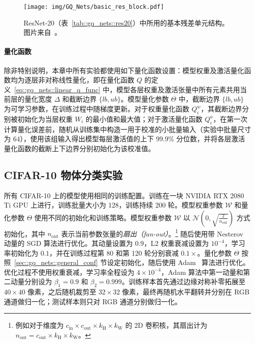 \documentclass[
  fontset = mac,
]{shtthesis}
\providecommand{\NormalDist}[1]{\mathcal{N} \left( #1 \right)}
\begin{document}
\begin{figure}[htb]
  \centering
  \texttt{[image: img/GQ\_Nets/basic\_res\_block.pdf]}
  \caption{ResNet-20（表~\ref{tab::gq_nets::res20}）中所用的基本残差单元结构。图片来自~\citet{He_2016}。}
  \label{img::gq_nets::basic_res_block}
\end{figure}

\paragraph{量化函数}
除非特别说明，本章中所有实验都使用如下量化函数设置：模型权重及激活量化函数均为逐层非对称线性量化，即在量化函数 $Q$ 的定义~\eqref{eq::gq_nets::linear_q_func} 中，模型各层权重及激活张量中所有元素共用当前层的量化宽度 $\Delta$ 和截断边界 $\{lb, ub\}$。模型量化参数 $\Theta$ 中，截断边界 $\{lb, ub\}$ 为可学习参数，在训练过程中随梯度更新。对于权重量化函数 $Q^w_i$，其截断边界分别被初始化为当层权重 $W_i$ 的最小值和最大值；对于激活量化函数 $Q^a_i$，在第一次计算量化误差前，随机从训练集中构造一用于校准的小批量输入（实验中批量尺寸为 $64$），使用该组输入得出模型每层激活值的上下 $99.9\%$ 分位数，并将各层激活量化函数的截断上下边界分别初始化为该校准值。
\subsection{CIFAR-10 物体分类实验} \label{sec::gq_nets::cifar10_experiments}
所有 CIFAR-10 上的模型使用相同的训练配置。训练在一块 NVIDIA RTX 2080 Ti GPU 上进行，训练批量大小为 128，训练持续 200 轮。模型权重参数 $\mathcal{W}$ 和量化参数 $\Theta$ 使用不同的初始化和训练策略。模型权重参数 $\mathcal{W}$ 以 $\NormalDist{0, \sqrt{\frac{2}{n_{\mathrm{out}}}}}$ 方式初始化，其中 $n_{\mathrm{out}}$ 表示当前参数张量的\emph{扇出（fan-out）}。\footnote{例如对于维度为 $c_{\mathrm{in}} \times c_{\mathrm{out}} \times k_{\mathrm{H}} \times k_{\mathrm{W}}$ 的 2D 卷积核，其扇出计为 $n_{\mathrm{out}}=c_{\mathrm{out}} \times k_{\mathrm{H}} \times k_{\mathrm{W}}$。} 随后使用带 Nesterov 动量的 SGD 算法进行优化。其动量设置为 $0.9$，L2 权重衰减设置为 $10^{-4}$，学习率初始化为 $0.1$，并在训练过程第 80 和第 120 轮分别衰减 $0.1\times$。量化参数 $\Theta$ 按照~\ref{sec::gq_nets::general_conf} 节设定初始化，随后使用 Adam~\citep{kingma2014adam} 算法进行优化。优化过程不使用权重衰减，学习率全程设为 $4\times 10^{-4}$，Adam 算法中第一动量和第二动量分别设为 $\beta_1 = 0.9$ 和 $\beta_2 = 0.999$。训练样本首先通过边缘对称补零拓展至 $40\times40$ 像素，之后随机裁剪至 $32\times 32$ 像素，最终再随机水平翻转并分别在 RGB 通道做归一化；测试样本则只对 RGB 通道分别做归一化。
\end{document}
